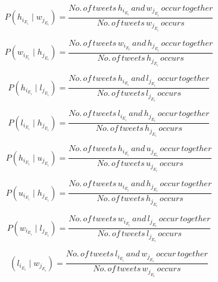 \begin{equation}
P(h_{i_{E_{i}}} \mid w_{j_{E_{i}}}) = \frac{No. \, of \, tweets \, h_{i_{E_{i}}} \, and \, w_{j_{E_{i}}} \, occur \, together}{No. \, of \, tweets \, w_{j_{E_{i}}} \, occurs}
\end{equation}

\begin{equation}
P(w_{i_{E_{i}}} \mid h_{j_{E_{i}}}) = \frac{No. \, of \, tweets \, w_{i_{E_{i}}} \, and \, h_{j_{E_{i}}} \, occur \, together}{No. \, of \, tweets \, h_{j_{E_{i}}} \, occurs}
\end{equation}

\begin{equation}
P(h_{i_{E_{i}}} \mid l_{j_{E_{i}}}) = \frac{No. \, of \, tweets \, h_{i_{E_{i}}} \, and \, l_{j_{E_{i}}} \, occur \, together}{No. \, of \, tweets \, l_{j_{E_{i}}} \, occurs}
\end{equation}

\begin{equation}
P(l_{i_{E_{i}}} \mid h_{j_{E_{i}}}) = \frac{No. \, of \, tweets \, l_{i_{E_{i}}} \, and \, h_{j_{E_{i}}} \, occur \, together}{No. \, of \, tweets  \, h_{j_{E_{i}}} \, occurs}
\end{equation}

\begin{equation}
P(h_{i_{E_{i}}} \mid u_{j_{E_{i}}}) = \frac{No. \, of \, tweets  \, h_{i_{E_{i}}} \, and \, u_{j_{E_{i}}} \, occur \, together}{No. \, of \, tweets  \, u_{j_{E_{i}}} \, occurs}
\end{equation}

\begin{equation}
P(u_{i_{E_{i}}} \mid h_{j_{E_{i}}}) = \frac{No. \, of \, tweets  \, u_{i_{E_{i}}} \, and \, h_{j_{E_{i}}} \, occur \, together}{No. \, of \, tweets  \, h_{j_{E_{i}}} \, occurs}
\end{equation}

\begin{equation}
P(w_{i_{E_{i}}} \mid l_{j_{E_{i}}}) = \frac{No. \, of \, tweets  \, w_{i_{E_{i}}} \, and \, l_{j_{E_{i}}} \, occur \, together}{No. \, of \, tweets  \, l_{j_{E_{i}}} \, occurs}
\end{equation}

\begin{equation}
(l_{i_{E_{i}}} \mid w_{j_{E_{i}}}) = \frac{No. \, of \, tweets  \, l_{i_{E_{i}}} \, and \, w_{j_{E_{i}}} \, occur \, together}{No. \, of \, tweets  \, w_{j_{E_{i}}} \, occurs}
\end{equation}

